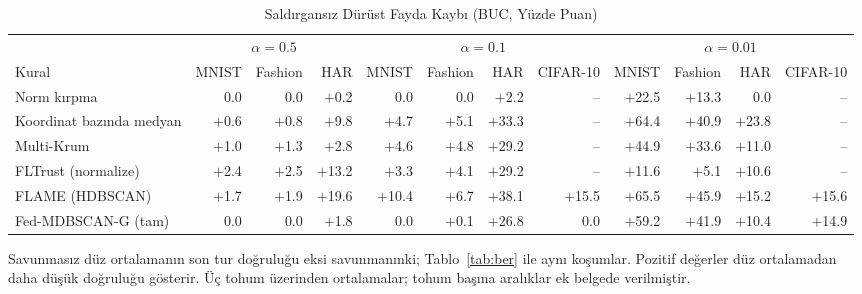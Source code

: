 \begin{table}[!tp]
\centering\footnotesize
\setlength{\tabcolsep}{4pt}
\caption{Saldırgansız Dürüst Fayda Kaybı (BUC, Yüzde Puan)}\label{tab:buc}
\begin{adjustbox}{max width=\textwidth}
\begin{tabular}{lrrrrrrrrrrr}
\toprule
& \multicolumn{3}{c}{$\alpha=0.5$} & \multicolumn{4}{c}{$\alpha=0.1$} & \multicolumn{4}{c}{$\alpha=0.01$} \\
\cmidrule(lr){2-4}\cmidrule(lr){5-8}\cmidrule(lr){9-12}
Kural & MNIST & Fashion & HAR & MNIST & Fashion & HAR & CIFAR-10 & MNIST & Fashion & HAR & CIFAR-10 \\
\midrule
Norm kırpma & 0.0 & 0.0 & $+$0.2 & 0.0 & 0.0 & $+$2.2 & -- & $+$22.5 & $+$13.3 & 0.0 & -- \\
Koordinat bazında medyan & $+$0.6 & $+$0.8 & $+$9.8 & $+$4.7 & $+$5.1 & $+$33.3 & -- & $+$64.4 & $+$40.9 & $+$23.8 & -- \\
Multi-Krum & $+$1.0 & $+$1.3 & $+$2.8 & $+$4.6 & $+$4.8 & $+$29.2 & -- & $+$44.9 & $+$33.6 & $+$11.0 & -- \\
FLTrust (normalize) & $+$2.4 & $+$2.5 & $+$13.2 & $+$3.3 & $+$4.1 & $+$29.2 & -- & $+$11.6 & $+$5.1 & $+$10.6 & -- \\
FLAME (HDBSCAN) & $+$1.7 & $+$1.9 & $+$19.6 & $+$10.4 & $+$6.7 & $+$38.1 & $+$15.5 & $+$65.5 & $+$45.9 & $+$15.2 & $+$15.6 \\
Fed-MDBSCAN-G (tam) & 0.0 & 0.0 & $+$1.8 & 0.0 & $+$0.1 & $+$26.8 & 0.0 & $+$59.2 & $+$41.9 & $+$10.4 & $+$14.9 \\
\bottomrule
\end{tabular}
\end{adjustbox}

\par\vspace{3pt}\parbox{\linewidth}{\footnotesize Savunmasız düz ortalamanın son tur doğruluğu eksi savunmanınki; Tablo~\ref{tab:ber} ile aynı koşumlar. Pozitif değerler düz ortalamadan daha düşük doğruluğu gösterir. Üç tohum üzerinden ortalamalar; tohum başına aralıklar ek belgede verilmiştir.}
\end{table}
